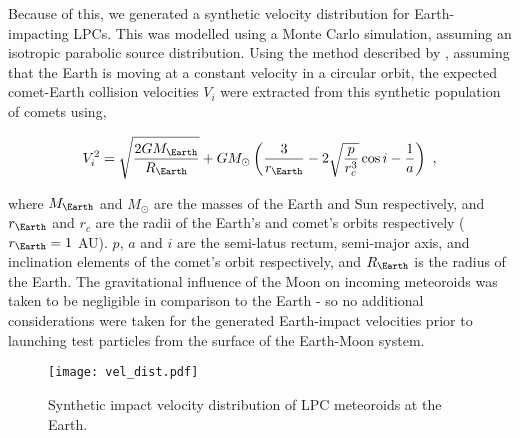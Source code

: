 Because of this, we generated a synthetic velocity distribution for Earth-impacting LPCs. This was modelled using a Monte Carlo simulation, assuming an isotropic parabolic source distribution. Using the method described by \cite{2000MNRAS.315..629H}, assuming that the Earth is moving at a constant velocity in a circular orbit, the expected comet-Earth collision velocities $V_i$ were extracted from this synthetic population of comets using,

\vspace{-1ex}
\begin{equation}
    V_i^2 = \sqrt{\dfrac{2GM_\Earth}{R_\Earth}} + GM_\odot \left(\dfrac{3}{r_\Earth}-2 \sqrt{\dfrac{p}{r_c^3}} \cos i - \dfrac{1}{a}\right) ~,
    \label{eq:im_vel}
\end{equation}

where $M_\Earth$ and $M_\odot$ are the masses of the Earth and Sun respectively, and $r_\Earth$ and $r_c$ are the radii of the Earth's and comet's orbits respectively ($r_\Earth = 1$ AU). $p$, $a$ and $i$ are the semi-latus rectum, semi-major axis, and inclination elements of the comet's orbit respectively, and $R_\Earth$ is the radius of the Earth. The gravitational influence of the Moon on incoming meteoroids was taken to be negligible in comparison to the Earth - so no additional considerations were taken for the generated Earth-impact velocities prior to launching test particles from the surface of the Earth-Moon system.

\begin{figure}[t!]
    \centering
    \texttt{[image: vel\_dist.pdf]}
    \caption[Velocity distribution of Earth-impacting cometary meteoroids]{Synthetic impact velocity distribution of LPC meteoroids at the Earth.}
    \label{fig:vel_dis}
\end{figure}

\iffalse
\begin{figure*}[t!]
    \centering
    \begin{subfigure}[t]{0.5\textwidth}
        \centering
        \texttt{[image: vel\_dist.pdf]}
        \caption{Lorem ipsum}
    \end{subfigure}%
    ~ 
    \begin{subfigure}[t]{0.5\textwidth}
        \centering
        \texttt{[image: vel\_dist.pdf]}
        \caption{Lorem ipsum, lorem ipsum,Lorem ipsum, lorem ipsum,Lorem ipsum}
    \end{subfigure}
\end{figure*}
\fi

